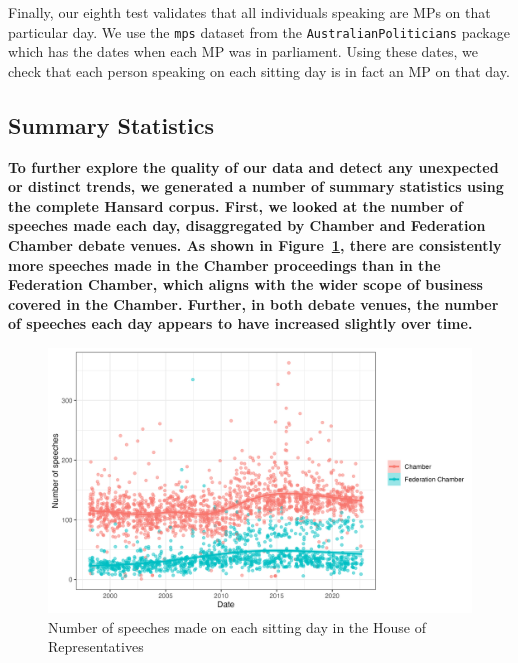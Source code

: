 \documentclass[
  letterpaper,
  DIV=11,
  numbers=noendperiod]{scrartcl}
\begin{document}
Finally, our eighth test validates that all individuals speaking are MPs
on that particular day. We use the \texttt{mps} dataset from the
\texttt{AustralianPoliticians} package which has the dates when each MP
was in parliament. Using these dates, we check that each person speaking
on each sitting day is in fact an MP on that day.

\hypertarget{summary-statistics}{%
\subsection{Summary Statistics}\label{summary-statistics}}

\textbf{To further explore the quality of our data and detect any
unexpected or distinct trends, we generated a number of summary
statistics using the complete Hansard corpus. First, we looked at the
number of speeches made each day, disaggregated by Chamber and
Federation Chamber debate venues. As shown in
Figure~\ref{fig-dailyspeeches}, there are consistently more speeches
made in the Chamber proceedings than in the Federation Chamber, which
aligns with the wider scope of business covered in the Chamber. Further,
in both debate venues, the number of speeches each day appears to have
increased slightly over time.}

\begin{figure}

{\centering \includegraphics[width=4.58333in,height=\textheight]{images/n_daily_speeches.png}

}

\caption{\label{fig-dailyspeeches}Number of speeches made on each
sitting day in the House of Representatives}

\end{figure}
\end{document}
